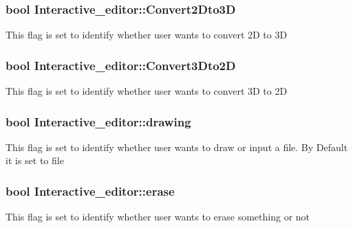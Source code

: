 \subsubsection[{\texorpdfstring{Convert2\+Dto3D}{Convert2Dto3D}}]{\setlength{\rightskip}{0pt plus 5cm}bool Interactive\+\_\+editor\+::\+Convert2\+Dto3D}\hypertarget{classInteractive__editor_a13a2206b6c7e86947e85830afb229f36}{}\label{classInteractive__editor_a13a2206b6c7e86947e85830afb229f36}
This flag is set to identify whether user wants to convert 2D to 3D 
\subsubsection[{\texorpdfstring{Convert3\+Dto2D}{Convert3Dto2D}}]{\setlength{\rightskip}{0pt plus 5cm}bool Interactive\+\_\+editor\+::\+Convert3\+Dto2D}\hypertarget{classInteractive__editor_a83829cee0dd00c90dbb841abde5596a4}{}\label{classInteractive__editor_a83829cee0dd00c90dbb841abde5596a4}
This flag is set to identify whether user wants to convert 3D to 2D 
\subsubsection[{\texorpdfstring{drawing}{drawing}}]{\setlength{\rightskip}{0pt plus 5cm}bool Interactive\+\_\+editor\+::drawing}\hypertarget{classInteractive__editor_ace62b483a0866c64212ee0c641445c7a}{}\label{classInteractive__editor_ace62b483a0866c64212ee0c641445c7a}
This flag is set to identify whether user wants to draw or input a file. By Default it is set to file 
\subsubsection[{\texorpdfstring{erase}{erase}}]{\setlength{\rightskip}{0pt plus 5cm}bool Interactive\+\_\+editor\+::erase}\hypertarget{classInteractive__editor_ac2f2f1dfb6c21585d4ed5ed043e41b25}{}\label{classInteractive__editor_ac2f2f1dfb6c21585d4ed5ed043e41b25}
This flag is set to identify whether user wants to erase something or not 
